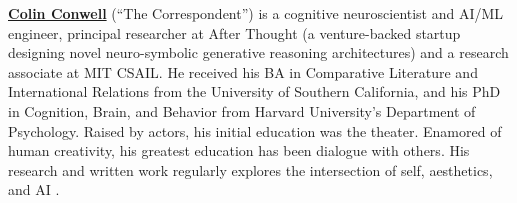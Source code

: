 \documentclass{article}
\begin{document}
\textbf{\href{https://www.colinconwell.com/}{Colin Conwell}} (``The Correspondent'')\label{bio:colin_conwell} is a cognitive neuroscientist and AI/ML engineer, principal researcher at After Thought (a venture-backed startup designing novel neuro-symbolic generative reasoning architectures) and a research associate at MIT CSAIL. He received his BA in Comparative Literature and International Relations from the University of Southern California, and his PhD in Cognition, Brain, and Behavior from Harvard University's Department of Psychology. Raised by actors, his initial education was the theater. Enamored of human creativity, his greatest education has been dialogue with others. His research and written work regularly explores the intersection of self, aesthetics, and AI \citep{conwell2015selfdelete, conwell2025perceptual}.







{\small


}

\newpage
%
\end{document}
